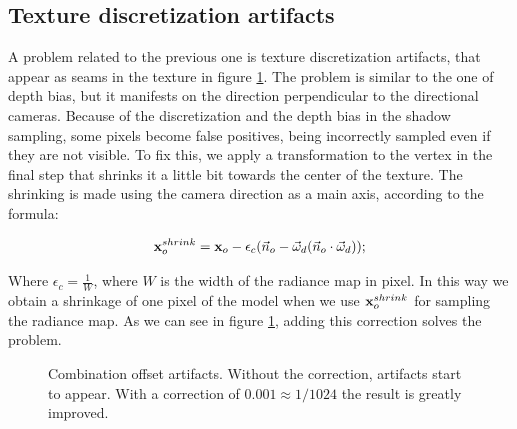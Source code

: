 \subsection{Texture discretization artifacts}
A problem related to the previous one is texture discretization artifacts, that appear as seams in the texture in figure \ref{fig:combias}. The problem is similar to the one of depth bias, but it manifests on the direction perpendicular to the directional cameras. Because of the discretization and the depth bias in the shadow sampling, some pixels become false positives, being incorrectly sampled even if they are not visible. To fix this, we apply a transformation to the vertex in the final step that shrinks it a little bit towards the center of the texture. The shrinking is made using the camera direction as a main axis, according to the formula:

$$
\mathbf{x}_o^{shrink} = \mathbf{x}_o - \epsilon_c (\vec{n}_o - \vec{\omega}_d (\vec{n}_o \cdot \vec{\omega}_d));
$$

Where $\epsilon_c = \frac{1}{W}$, where $W$ is the width of the radiance map in pixel. In this way we obtain a shrinkage of one pixel of the model when we use $\mathbf{x}_o^{shrink}$ for sampling the radiance map. As we can see in figure \ref{fig:combias}, adding this correction solves the problem.

\begin{figure}
\centering
{}
\caption{Combination offset artifacts. Without the correction, artifacts start to appear. With a correction of $0.001 \approx 1 / 1024$ the result is greatly improved.}
\label{fig:combias}
\end{figure}


